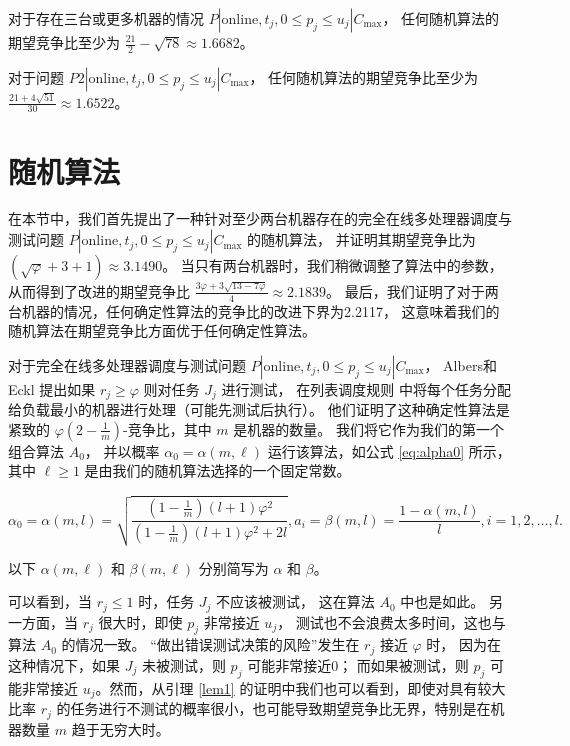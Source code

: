 \begin{thm}
    \label{thm:thm2}
    对于存在三台或更多机器的情况 \( P | \text{online}, t_j, 0 \leq p_j \leq u_j | C_{\max} \)，
    任何随机算法的期望竞争比至少为 \( \frac{21}{2} - \sqrt{78} \approx 1.6682 \)。
\end{thm}

\begin{thm}
    \label{thm:thm3}
    对于问题 \( P2 | \text{online}, t_j, 0 \leq p_j \leq u_j | C_{\max} \)，
    任何随机算法的期望竞争比至少为 \( \frac{21 + 4\sqrt{51}}{30} \approx 1.6522 \)。
\end{thm}

\section{随机算法}

在本节中，我们首先提出了一种针对至少两台机器存在的完全在线多处理器调度与测试问题 
\( P | \text{online}, t_j, 0 \leq p_j \leq u_j | C_{\max} \) 的随机算法，
并证明其期望竞争比为 \( (\sqrt{\varphi} + 3 + 1) \approx 3.1490 \)。
当只有两台机器时，我们稍微调整了算法中的参数，
从而得到了改进的期望竞争比 \( \frac{3\varphi + 3\sqrt{13 - 7\varphi}}{4} \approx 2.1839 \)。
最后，我们证明了对于两台机器的情况，任何确定性算法的竞争比的改进下界为2.2117，
这意味着我们的随机算法在期望竞争比方面优于任何确定性算法。

对于完全在线多处理器调度与测试问题 \( P | \text{online}, t_j, 0 \leq p_j \leq u_j | C_{\max} \)，
Albers和Eckl\cite{albers2021explorable} 提出如果 \( r_j \geq \varphi \) 则对任务 \( J_j \) 进行测试，
在列表调度规则 \cite{graham1966bounds} 中将每个任务分配给负载最小的机器进行处理（可能先测试后执行）。
他们证明了这种确定性算法是紧致的 \( \varphi(2 - \frac{1}{m}) \)-竞争比，其中 \( m \) 是机器的数量。
我们将它作为我们的第一个组合算法 \( A_0 \)，
并以概率 \( \alpha_0 = \alpha(m, \ell) \) 运行该算法，如公式 \ref{eq:alpha0} 所示，
其中 \( \ell \geq 1 \) 是由我们的随机算法选择的一个固定常数。

\begin{equation}
    \alpha_0 = \alpha(m,l)
    = \sqrt{\dfrac{(1-\frac 1m)(l+1)\varphi^2}{(1-\frac 1m)(l+1)\varphi^2+2l}},
    a_i = \beta(m,l) = \dfrac{1-\alpha(m,l)}{l}, i = 1,2,\dots,l.
    \label{eq:alpha0}
\end{equation}

以下 \( \alpha(m, \ell) \) 和 \( \beta(m, \ell) \) 分别简写为 \( \alpha \) 和 \( \beta \)。

可以看到，当 \( r_j \leq 1 \) 时，任务 \( J_j \) 不应该被测试，
这在算法 \( A_0 \) 中也是如此。
另一方面，当 \( r_j \) 很大时，即使 \( p_j \) 非常接近 \( u_j \)，
测试也不会浪费太多时间，这也与算法 \( A_0 \) 的情况一致。
“做出错误测试决策的风险”发生在 \( r_j \) 接近 \( \varphi \) 时，
因为在这种情况下，如果 \( J_j \) 未被测试，则 \( p_j \) 可能非常接近0；
而如果被测试，则 \( p_j \) 可能非常接近 \( u_j \)。然而，从引理 \ref{lem1} 的证明中我们也可以看到，即使对具有较大比率 \( r_j \) 的任务进行不测试的概率很小，也可能导致期望竞争比无界，特别是在机器数量 \( m \) 趋于无穷大时。

